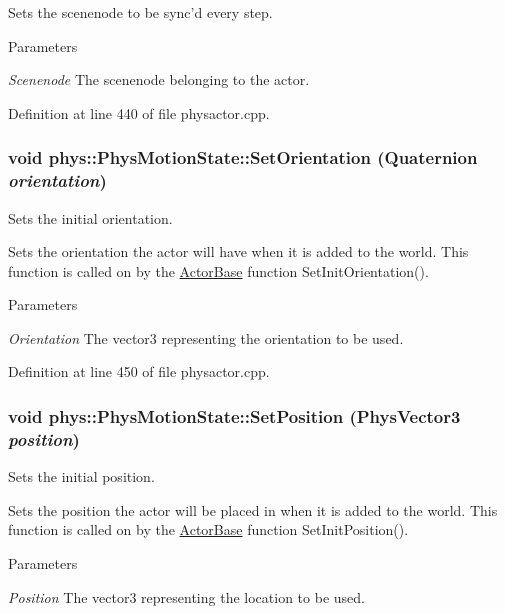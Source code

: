 Sets the scenenode to be sync'd every step. 
\begin{DoxyParams}{Parameters}
\item[{\em Scenenode}]The scenenode belonging to the actor. \end{DoxyParams}


Definition at line 440 of file physactor.cpp.

\hypertarget{classphys_1_1PhysMotionState_ac799070edfea4d1c442e3ed0857bcb1d}{
\subsubsection[{SetOrientation}]{\setlength{\rightskip}{0pt plus 5cm}void phys::PhysMotionState::SetOrientation ({\bf Quaternion} {\em orientation})}}
\label{dc/d0d/classphys_1_1PhysMotionState_ac799070edfea4d1c442e3ed0857bcb1d}


Sets the initial orientation. 

Sets the orientation the actor will have when it is added to the world. This function is called on by the \hyperlink{classphys_1_1ActorBase}{ActorBase} function SetInitOrientation(). 
\begin{DoxyParams}{Parameters}
\item[{\em Orientation}]The vector3 representing the orientation to be used. \end{DoxyParams}


Definition at line 450 of file physactor.cpp.

\hypertarget{classphys_1_1PhysMotionState_a083029e5dbcfafd573d47331ff8660cb}{
\subsubsection[{SetPosition}]{\setlength{\rightskip}{0pt plus 5cm}void phys::PhysMotionState::SetPosition ({\bf PhysVector3} {\em position})}}
\label{dc/d0d/classphys_1_1PhysMotionState_a083029e5dbcfafd573d47331ff8660cb}


Sets the initial position. 

Sets the position the actor will be placed in when it is added to the world. This function is called on by the \hyperlink{classphys_1_1ActorBase}{ActorBase} function SetInitPosition(). 
\begin{DoxyParams}{Parameters}
\item[{\em Position}]The vector3 representing the location to be used. \end{DoxyParams}


